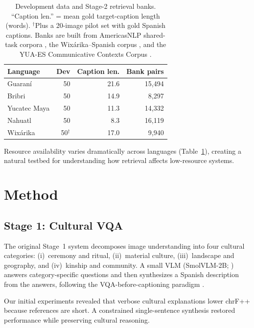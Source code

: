 \documentclass[11pt]{article}
\begin{document}
\begin{table}[t]
\centering
\small
\begin{tabular}{lrrr}
\toprule
Language & Dev & Caption len. & Bank pairs \\
\midrule
Guaraní       & 50 & 21.6 & 15{,}494 \\
Bribri        & 50 & 14.9 & 8{,}297 \\
Yucatec Maya  & 50 & 11.3 & 14{,}332 \\
Nahuatl       & 50 & 8.3  & 16{,}119 \\
Wixárika      & 50$^{\dagger}$ & 17.0 & 9{,}940 \\
\bottomrule
\end{tabular}
\caption{Development data and Stage-2 retrieval banks. ``Caption len.'' =
mean gold target-caption length (words). $^{\dagger}$Plus a 20-image pilot
set with gold Spanish captions. Banks are built from AmericasNLP shared-task
corpora \citep{mager2021americasnlp,ebrahimi2023americasnlp}, the
Wixárika--Spanish corpus \citep{mager2018wixarika}, and the YUA-ES
Communicative Contexts Corpus \citep{molina2026yuaes}.}
\label{tab:data}
\end{table}

Resource availability varies dramatically across languages
(Table~\ref{tab:data}), creating a natural testbed for understanding how
retrieval affects low-resource systems.

\section{Method}

\subsection{Stage 1: Cultural VQA}
The original Stage~1 system decomposes image understanding into four cultural
categories: (i)~ceremony and ritual, (ii)~material culture, (iii)~landscape
and geography, and (iv)~kinship and community. A small VLM
(SmolVLM-2B; \citealp{marafioti2025smolvlm}) answers category-specific
questions and then synthesizes a Spanish description from the answers,
following the VQA-before-captioning paradigm \citep{yun2024cic}.

Our initial experiments revealed that verbose cultural explanations lower
chrF++ because references are short. A constrained single-sentence synthesis
restored performance while preserving cultural reasoning.
\end{document}
